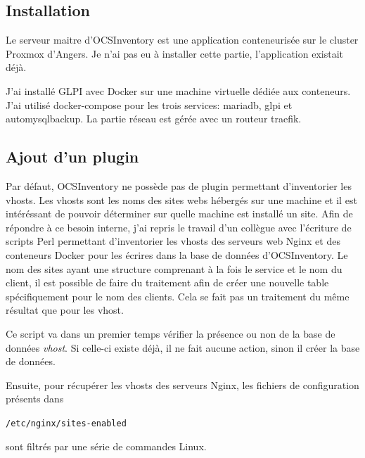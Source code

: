 \documentclass[12pt]{article}
\begin{document}
\newpage
\subsection{Installation}
Le serveur maitre d'\gls{OCSInventory} est une application conteneurisée sur le \gls{cluster} \gls{Proxmox} d'Angers.
Je n'ai pas eu à installer cette partie, l'application existait déjà.

J'ai installé \gls{GLPI} avec Docker sur une machine virtuelle dédiée aux conteneurs.
J'ai utilisé docker-compose pour les trois services: mariadb, glpi et automysqlbackup.
La partie réseau est gérée avec un routeur traefik.

\subsection{Ajout d'un plugin}
Par défaut, \gls{OCSInventory} ne possède pas de plugin permettant d'inventorier les vhosts. 
Les vhosts sont les noms des sites webs hébergés sur une machine et il est intéréssant de pouvoir déterminer sur quelle machine est installé un site. 
Afin de répondre à ce besoin interne, j'ai repris le travail d'un collègue avec l'écriture de scripts Perl permettant d'inventorier les vhosts des serveurs web Nginx et des conteneurs Docker pour les écrires dans la base de données d'\gls{OCSInventory}.
Le nom des sites ayant une structure comprenant à la fois le service et le nom du client, il est possible de faire du traitement afin de créer une nouvelle table spécifiquement pour le nom des clients.
Cela se fait pas un traitement du même résultat que pour les vhost.

Ce script va dans un premier temps vérifier la présence ou non de la base de données \textit{vhost}.
Si celle-ci existe déjà, il ne fait aucune action, sinon il créer la base de données.

Ensuite, pour récupérer les vhosts des serveurs Nginx, les fichiers de configuration présents dans \begin{code} \texttt{/etc/nginx/sites-enabled}\end{code} sont filtrés par une série de commandes \gls{Linux}.
\end{document}
